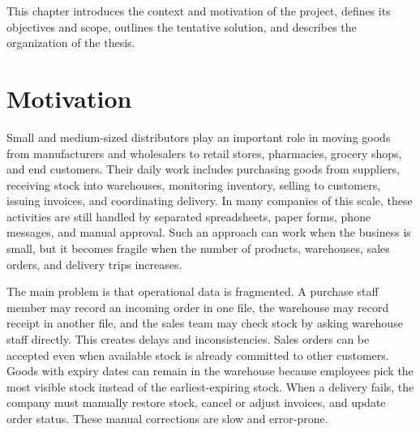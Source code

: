 \raggedbottom

This chapter introduces the context and motivation of the project, defines its
objectives and scope, outlines the tentative solution, and describes the
organization of the thesis.

\section{Motivation}
Small and medium-sized distributors play an important role in moving goods from
manufacturers and wholesalers to retail stores, pharmacies, grocery shops, and
end customers. Their daily work includes purchasing goods from suppliers,
receiving stock into warehouses, monitoring inventory, selling to customers,
issuing invoices, and coordinating delivery. In many companies of this scale,
these activities are still handled by separated spreadsheets, paper forms,
phone messages, and manual approval. Such an approach can work when the business
is small, but it becomes fragile when the number of products, warehouses, sales
orders, and delivery trips increases.

The main problem is that operational data is fragmented. A purchase staff member
may record an incoming order in one file, the warehouse may record receipt in
another file, and the sales team may check stock by asking warehouse staff
directly. This creates delays and inconsistencies. Sales orders can be accepted
even when available stock is already committed to other customers. Goods with
expiry dates can remain in the warehouse because employees pick the most visible
stock instead of the earliest-expiring stock. When a delivery fails, the company
must manually restore stock, cancel or adjust invoices, and update order status.
These manual corrections are slow and error-prone.

